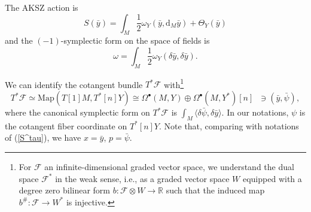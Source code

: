 \documentclass{amsart}
\theoremstyle{plain} %
\theoremstyle{definition}
\theoremstyle{remark}
\newcommand{\mr}{\mathrm}
\newcommand{\bt}{\bullet}
\newcommand{\ra}{\rightarrow}
\newcommand{\F}{\mathcal{F}}
\newcommand{\dr}{\mathrm{d}}
\begin{document}
The AKSZ action is
\begin{equation}
    S(\bar{y})=\int_M \frac12 \omega_Y(\bar{y},\dr_M \bar{y})+\Theta_Y(\bar{y})
\end{equation}
and the $(-1)$-symplectic form on the space of fields is
\begin{equation}
    \omega= \int_M \frac12\omega_Y(\delta \bar{y},\delta \bar{y}).
\end{equation}

We can identify the cotangent bundle $T^*\F$ with\footnote{For $\F$ an infinite-dimensional graded vector space, we understand the dual  space $\F^*$ in the weak sense, i.e., as a graded vector space $W$ equipped with a degree zero bilinear form $b\colon \F\otimes W\ra \mathbb{R}$ such that the induced map $b^\#\colon \F\ra W^*$ is injective.}
\begin{equation}
    T^*\F\simeq \mr{Map}(T[1]M,T^*[n]Y)\cong \Omega^\bt(M,Y)\oplus \Omega^\bt(M,Y^*)[n] \;\; \ni (\bar{y},\bar\psi),
\end{equation}
where the canonical symplectic form on $T^*\F$ is 
$\int_M \langle \delta \bar\psi,\delta\bar{y} \rangle$. In our notations, $\psi$ is the cotangent fiber coordinate on $T^*[n]Y$. %
Note that, comparing with notations of (\ref{S^tau}), we have $x=\bar{y}$, $p=\bar\psi$.
\end{document}
